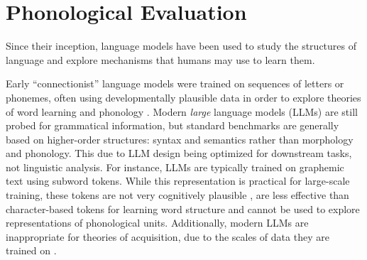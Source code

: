 
\section{Phonological Evaluation}\label{sec:12-phoneval}


Since their inception, language models have been used to study the structures of language and explore mechanisms that humans may use to learn them. 


Early ``connectionist'' language models were trained on sequences of letters or phonemes, often using developmentally plausible data in order to explore theories of word learning and phonology \citep{seidenberg1989distributed, norris1994shortlist, coltheart2001drc}. Modern \emph{large} language models (LLMs) are still probed for grammatical information, but standard benchmarks are generally based on higher-order structures: syntax and semantics rather than morphology and phonology. This due to LLM design being optimized for downstream tasks, not linguistic analysis. For instance, LLMs are typically trained on graphemic text using subword tokens. While this representation is practical for large-scale training, these tokens are not very cognitively plausible \citep{beinborn-pinter-2023-analyzing}, are less effective than character-based tokens for learning word structure \citep{bunzeck2025subwordmodelsstruggleword} and cannot be used to explore representations of phonological units. Additionally, modern LLMs are inappropriate for theories of acquisition, due to the scales of data they are trained on \citep{warstadt-2023-babylm-findings}.

